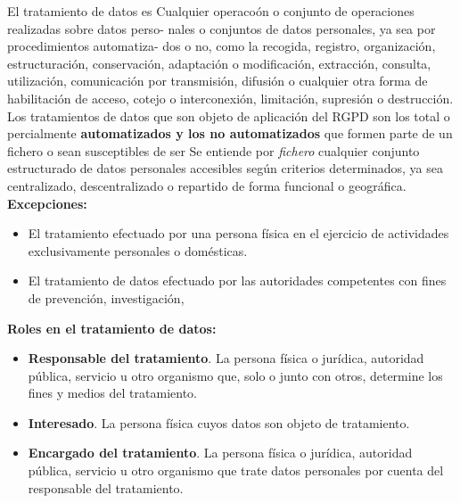 \documentclass[spanish, 12pt, a4paper, twoside]{article}
\begin{document}
El tratamiento de datos es Cualquier operacoón o conjunto de operaciones realizadas sobre datos perso-
nales o conjuntos de datos personales, ya sea por procedimientos automatiza-
dos o no, como la recogida, registro, organización, estructuración, conservación,
adaptación o modificación, extracción, consulta, utilización, comunicación por
transmisión, difusión o cualquier otra forma de habilitación de acceso, cotejo o
interconexión, limitación, supresión o destrucción.\\

Los tratamientos de datos que son objeto de aplicación del RGPD son los total o percialmente
\textbf{automatizados y los no automatizados} que formen parte de un fichero o sean susceptibles de ser
Se entiende por \textit{fichero} cualquier conjunto estructurado de datos personales accesibles según 
criterios determinados, ya sea centralizado, descentralizado o repartido de forma funcional o geográfica.\\

\textbf{Excepciones:}
\begin{itemize}
    \item El tratamiento efectuado por una persona física en el ejercicio de actividades exclusivamente
    personales o domésticas.
    \item El tratamiento de datos efectuado por las autoridades competentes con fines de prevención, investigación,
\end{itemize}
\break

\textbf{Roles en el tratamiento de datos:}\\
\begin{itemize}
    \item \textbf{Responsable del tratamiento}. La persona física o jurídica, autoridad pública, servicio u otro organismo que, solo o junto con otros, determine los fines y medios del tratamiento.
    \item \textbf{Interesado}. La persona física cuyos datos son objeto de tratamiento.
    \item \textbf{Encargado del tratamiento}. La persona física o jurídica, autoridad pública, servicio u otro organismo que trate datos personales por cuenta del responsable del tratamiento.
\end{itemize}

\hfill \break 
\end{document}
